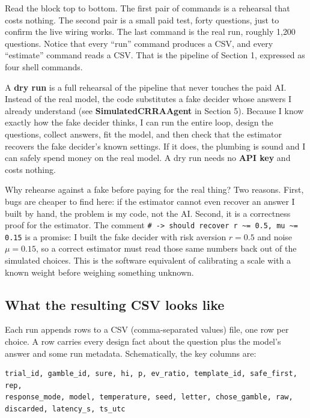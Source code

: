 \documentclass[11pt]{article}
\newcommand{\term}[1]{\textbf{\color{mossdk}#1}}
\newcommand{\file}[1]{\textbf{\ttfamily #1}}
\begin{document}
Read the block top to bottom. The first pair of commands is a rehearsal that costs nothing. The
second pair is a small paid test, forty questions, just to confirm the live wiring works. The last
command is the real run, roughly 1{,}200 questions. Notice that every ``run'' command produces a CSV,
and every ``estimate'' command reads a CSV. That is the pipeline of Section 1, expressed as four
shell commands.

\begin{defbox}
A \term{dry run} is a full rehearsal of the pipeline that never touches the paid AI. Instead of the
real model, the code substitutes a fake decider whose answers I already understand (see
\file{SimulatedCRRAAgent} in Section 5). Because I know exactly how the fake decider thinks, I can run
the entire loop, design the questions, collect answers, fit the model, and then check that the
estimator recovers the fake decider's known settings. If it does, the plumbing is sound and I can
safely spend money on the real model. A dry run needs no \term{API key} and costs nothing.
\end{defbox}

Why rehearse against a fake before paying for the real thing? Two reasons. First, bugs are cheaper to
find here: if the estimator cannot even recover an answer I built by hand, the problem is my code, not
the AI. Second, it is a correctness proof for the estimator. The comment \verb|# -> should recover r ~= 0.5, mu ~= 0.15|
is a promise: I built the fake decider with risk aversion $r = 0.5$ and noise $\mu = 0.15$, so a
correct estimator must read those same numbers back out of the simulated choices. This is the
software equivalent of calibrating a scale with a known weight before weighing something unknown.

\subsection{What the resulting CSV looks like}

Each run appends rows to a CSV (comma-separated values) file, one row per choice. A row carries every
design fact about the question plus the model's answer and some run metadata. Schematically, the key
columns are:

\begin{lstlisting}[style=sh]
trial_id, gamble_id, sure, hi, p, ev_ratio, template_id, safe_first, rep,
response_mode, model, temperature, seed, letter, chose_gamble, raw,
discarded, latency_s, ts_utc
\end{lstlisting}
\end{document}
